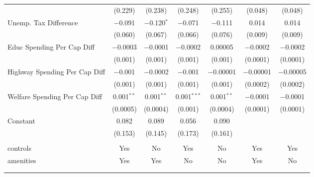 \begin{table}[!htbp]
\begin{tabular}{@{\extracolsep{5pt}}lcccccc}
  & (0.229) & (0.238) & (0.248) & (0.255) & (0.048) & (0.048) \\ 
  Unemp. Tax Difference & $-$0.091 & $-$0.120$^{*}$ & $-$0.071 & $-$0.111 & 0.014 & 0.014 \\ 
  & (0.060) & (0.067) & (0.066) & (0.076) & (0.009) & (0.009) \\ 
  Educ Spending Per Cap Diff & $-$0.0003 & $-$0.0001 & $-$0.0002 & 0.00005 & $-$0.0002 & $-$0.0002 \\ 
  & (0.001) & (0.001) & (0.001) & (0.001) & (0.0001) & (0.0001) \\ 
  Highway Spending Per Cap Diff & $-$0.001 & $-$0.0002 & $-$0.001 & $-$0.00001 & $-$0.00001 & $-$0.00005 \\ 
  & (0.001) & (0.001) & (0.001) & (0.001) & (0.0002) & (0.0002) \\ 
  Welfare Spending Per Cap Diff & 0.001$^{**}$ & 0.001$^{**}$ & 0.001$^{***}$ & 0.001$^{**}$ & $-$0.0001 & $-$0.0001 \\ 
  & (0.0005) & (0.0004) & (0.001) & (0.0004) & (0.0001) & (0.0001) \\ 
  Constant & 0.082 & 0.089 & 0.056 & 0.090 &  &  \\ 
  & (0.153) & (0.145) & (0.173) & (0.161) &  &  \\ 
 \hline \\[-1.8ex] 
controls & Yes & No & Yes & No & Yes & Yes \\ 
amenities & Yes & Yes & No & No & Yes & No \\ 
\hline \\[-1.8ex] 
\hline 
\hline \\[-1.8ex] 
\end{tabular} 
\end{table} 
